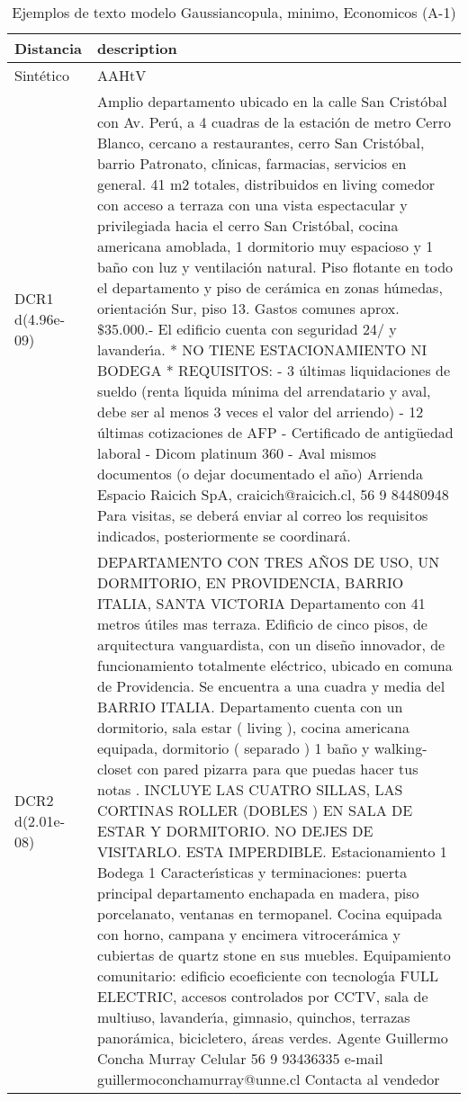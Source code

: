 \begin{table}[H]
\centering
\fontsize{10}{14}\selectfont
\caption{Ejemplos de texto modelo Gaussiancopula, minimo, Economicos (A-1)}
\label{table-example-economicos-a-1-gaussiancopula-min-text}
\begin{tabular}{|l|m{35em}|}
\hline
\rowcolor[gray]{0.8}
Distancia & description \\
\hline Sintético & AAHtV \\
\hline DCR1 d(4.96e-09) & Amplio departamento ubicado en la calle San Crist\'obal con Av. Per\'u, a 4 cuadras de la estaci\'on de metro Cerro Blanco, cercano a restaurantes, cerro San Crist\'obal, barrio Patronato, cl{\'\i}nicas, farmacias, servicios en general. 41 m2 totales, distribuidos en living comedor con acceso a terraza con una vista espectacular y privilegiada hacia el cerro San Crist\'obal, cocina americana amoblada, 1 dormitorio muy espacioso y 1 ba\~no con luz y ventilaci\'on natural. Piso flotante en todo el departamento y piso de cer\'amica en zonas h\'umedas, orientaci\'on Sur, piso 13. Gastos comunes aprox. \$35.000.- El edificio cuenta con seguridad 24/ y lavander{\'\i}a. * NO TIENE ESTACIONAMIENTO NI BODEGA  * REQUISITOS: - 3 \'ultimas liquidaciones de sueldo (renta l{\'\i}quida m{\'\i}nima del arrendatario y aval, debe ser al menos 3 veces el valor del arriendo) - 12 \'ultimas cotizaciones de AFP - Certificado de antig\"uedad laboral - Dicom platinum 360 - Aval mismos documentos (o dejar documentado el a\~no)  Arrienda Espacio Raicich SpA, craicich@raicich.cl, 56 9 84480948 Para visitas, se deber\'a enviar al correo los requisitos indicados, posteriormente se coordinar\'a. \\
\hline DCR2 d(2.01e-08) & DEPARTAMENTO CON TRES A\~NOS DE USO, UN DORMITORIO, EN PROVIDENCIA, BARRIO ITALIA, SANTA VICTORIA  Departamento con 41 metros \'utiles mas terraza. Edificio de cinco pisos, de arquitectura vanguardista, con un dise\~no innovador, de funcionamiento totalmente el\'ectrico, ubicado en comuna de Providencia. Se encuentra a una cuadra y media del BARRIO ITALIA. Departamento cuenta con un dormitorio, sala estar ( living ), cocina americana equipada, dormitorio ( separado ) 1 ba\~no y walking-closet con pared pizarra para que puedas hacer tus notas . INCLUYE LAS CUATRO SILLAS, LAS CORTINAS ROLLER (DOBLES ) EN SALA DE ESTAR Y DORMITORIO. NO DEJES DE VISITARLO. ESTA IMPERDIBLE.   Estacionamiento 1 Bodega 1  Caracter{\'\i}sticas y terminaciones: puerta principal departamento enchapada en madera, piso porcelanato, ventanas en termopanel. Cocina equipada con horno, campana y encimera vitrocer\'amica y cubiertas de quartz stone en sus muebles.  Equipamiento comunitario: edificio ecoeficiente con tecnolog{\'\i}a FULL ELECTRIC, accesos controlados por CCTV, sala de multiuso, lavander{\'\i}a, gimnasio, quinchos, terrazas panor\'amica, bicicletero, \'areas verdes.   Agente Guillermo Concha Murray Celular 56 9 93436335 e-mail guillermoconchamurray@unne.cl Contacta al vendedor \\
\hline
\end{tabular}
\end{table}

